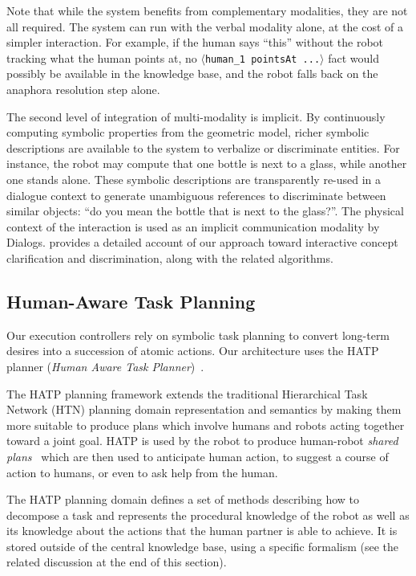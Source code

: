 \documentclass[preprint,3p,times]{elsarticle}
\newcommand{\stmt}[1]{{\footnotesize\tt$\langle$#1\relax$\rangle$}}
\begin{document}
Note that while the system benefits from complementary modalities, they are not
all required. The system can run with the verbal modality alone, at the cost of
a simpler interaction. For example, if the human says ``this'' without the robot
tracking what the human points at, no \stmt{human\_1 pointsAt ...} fact would
possibly be available in the knowledge base, and the robot falls back on the
anaphora resolution step alone.

The second level of integration of multi-modality is implicit. By continuously
computing symbolic properties from the geometric model, richer symbolic
descriptions are available to the system to verbalize or discriminate entities.
For instance, the robot may compute that one bottle is next to a glass, while
another one stands alone. These symbolic descriptions are transparently
re-used in a dialogue context to generate unambiguous references to discriminate
between similar objects: ``do you mean the bottle that is next to the glass?''.
The physical context of the interaction is used as an implicit communication
modality by {\sc Dialogs}. \cite{Ros2010b} provides a detailed account of our
approach toward interactive concept clarification and discrimination, along with the
related algorithms.


\subsection{Human-Aware Task Planning}
\label{hatp}

Our execution controllers rely on symbolic task planning to convert long-term
desires into a succession of atomic actions. Our architecture uses the HATP
planner (\emph{Human Aware Task Planner})~\cite{Alili2008,
Alili2009,Lallement2014}.

The HATP planning framework extends the traditional Hierarchical Task
Network (HTN) planning domain representation and semantics by making them more
suitable to produce plans which involve humans and robots acting together
toward a joint goal. HATP is used by the robot to produce human-robot
\emph{shared plans}~\cite{Grosz1996,Clark1996,Kemp2007} which are then used to
anticipate human action, to suggest a course of action to humans, or even to ask
help from the human.

The HATP planning domain defines a set of methods describing how to
decompose a task and represents the procedural knowledge of the robot as well as
its knowledge about the actions that the human partner is able to achieve. It is
stored outside of the central knowledge base, using a specific formalism (see
the related discussion at the end of this section).
\end{document}

